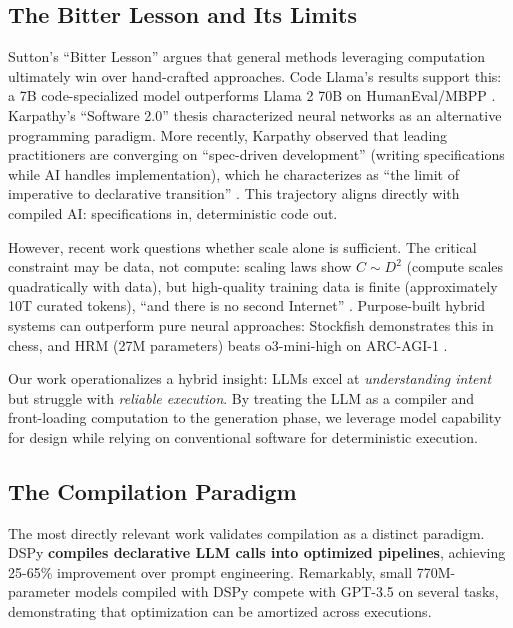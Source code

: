 \documentclass[11pt]{article}
\begin{document}
\subsection{The Bitter Lesson and Its Limits}

Sutton's ``Bitter Lesson'' \citep{sutton2019bitter} argues that general methods leveraging computation ultimately win over hand-crafted approaches. Code Llama's results support this: a 7B code-specialized model outperforms Llama 2 70B on HumanEval/MBPP \citep{roziere2023codellama}. Karpathy's ``Software 2.0'' thesis \citep{karpathy2017software2} characterized neural networks as an alternative programming paradigm. More recently, Karpathy observed that leading practitioners are converging on ``spec-driven development'' (writing specifications while AI handles implementation), which he characterizes as ``the limit of imperative to declarative transition'' \citep{karpathy2026specdriven}. This trajectory aligns directly with compiled AI: specifications in, deterministic code out.

However, recent work questions whether scale alone is sufficient. The critical constraint may be data, not compute: scaling laws show $C \sim D^2$ (compute scales quadratically with data), but high-quality training data is finite (approximately 10T curated tokens), ``and there is no second Internet'' \citep{chakrabarti2025bitter}. Purpose-built hybrid systems can outperform pure neural approaches: Stockfish demonstrates this in chess, and HRM (27M parameters) beats o3-mini-high on ARC-AGI-1 \citep{breunig2025bitter}.

Our work operationalizes a hybrid insight: LLMs excel at \emph{understanding intent} but struggle with \emph{reliable execution}. By treating the LLM as a compiler and front-loading computation to the generation phase, we leverage model capability for design while relying on conventional software for deterministic execution.

\subsection{The Compilation Paradigm}

The most directly relevant work validates compilation as a distinct paradigm. DSPy \citep{khattab2023dspy} \textbf{compiles declarative LLM calls into optimized pipelines}, achieving 25-65\% improvement over prompt engineering. Remarkably, small 770M-parameter models compiled with DSPy compete with GPT-3.5 on several tasks, demonstrating that optimization can be amortized across executions.
\end{document}
